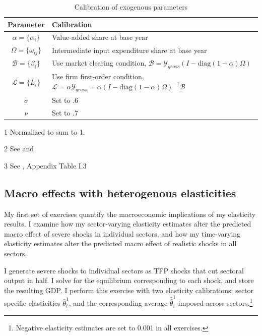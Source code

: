 \documentclass[11pt]{article}
\begin{document}
\begin{table}[h]
    \centering
    \begin{threeparttable}
    \caption{Calibration of exogenous parameters}
    \begin{tabular}{|c|l|}
    \hline
    \textbf{Parameter} & \textbf{Calibration} \\ \hline
    $\alpha = \{\alpha_i\}$ & Value-added share at base year \\ \hline
    $\Omega = \{\omega_{ij}\}$ & Intermediate input expenditure share at base year \\ \hline
    $\mathcal{B} = \{\beta_i\}$ & Use market clearing condition, $\mathcal{B} = \mathcal{Y}_{gross} (I - \text{diag}(1-\alpha)\Omega)$\tnote{1} \\ \hline
    $\mathcal{L} = \{L_i\}$ & Use firm first-order condition, $\mathcal{L} = \alpha \mathcal{Y}_{gross} = \alpha(I - \text{diag}(1-\alpha)\Omega)^{-1} \mathcal{B}$ \\ \hline
    ${\sigma}$ & Set to .6 \tnote{2} \\ \hline
    $\nu$ & Set to .7 \tnote{3} \\ \hline
    \end{tabular}
    \begin{tablenotes}
    \footnotesize
    \item[1] Normalized to sum to 1.
    \item[2] See \citet{oberfieldMicroDataMacro2021} and \citet{carvalhoSupplyChainDisruptions2021}
    \item[3] See \citet{oberfieldMicroDataMacro2021}, Appendix Table I.3
    \end{tablenotes}
    \label{tab:calibration}
    \end{threeparttable}
\end{table}

\subsection{Macro effects with heterogenous elasticities} 

My first set of exercises quantify the macroeconomic implications of my elasticity results. I examine how my sector-varying elasticity estimates alter the predicted macro effect of severe shocks in individual sectors, and how my time-varying elasticity estimates alter the predicted macro effect of realistic shocks in all sectors.

I generate severe shocks to individual sectors as TFP shocks that cut sectoral output in half. I solve for the equilibrium corresponding to each shock, and store the resulting GDP. I perform this exercise with two elasticity calibrations: sector specific elasticities $\hat{\theta}^1_i$, and the corresponding average $\bar{\hat{\theta}}^1_i$ imposed across sectors.\footnote{Negative elasticity estimates are set to 0.001 in all exercises.}
\end{document}
